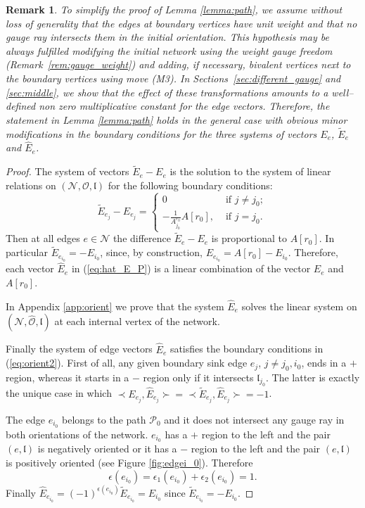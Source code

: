 \documentclass[11pt]{amsart}
\theoremstyle{plain}
\numberwithin{equation}{section}
\newtheorem{remark}{Remark}[subsection]
\begin{document}
\begin{remark}
To simplify the proof of Lemma \ref{lemma:path}, we assume without loss of generality that the edges at boundary vertices have unit weight and that no gauge ray intersects them in the initial orientation. This hypothesis may be always fulfilled modifying the initial network using the weight gauge freedom (Remark~\ref{rem:gauge_weight}) and adding, if necessary, bivalent vertices next to the boundary vertices using move (M3). 
In Sections~\ref{sec:different_gauge} and \ref{sec:middle}, we show that the effect of these transformations amounts to a well--defined non zero multiplicative constant for the edge vectors. Therefore, the statement in Lemma \ref{lemma:path} holds in the general case with obvious minor modifications in the boundary conditions for the three systems of vectors $E_e$, $\tilde E_e$ and $\hat E_e$.
\end{remark}


\begin{proof}
The system of vectors  $\tilde E_e - E_e$ is the solution to the system of linear relations on 
$({\mathcal N},\mathcal O,\mathfrak l)$ for the following boundary conditions: 
\[
\tilde E_{e_{j}}-E_{e_{j}} = \left\{ \begin{array}{ll} 0 & \mbox{ if } j\not = j_0;\\
-\frac{1}{A^{r_0}_{j_0}} A[r_0], &\mbox{ if } j = j_0.
\end{array}
\right.
\]
Then at all edges $e\in {\mathcal N}$ the difference $\tilde E_{e}-E_{e}$ is proportional to $A[r_0]$. In particular $\tilde E_{e_{i_0}} = -E_{i_0}$, since, by construction, $E_{e_{i_0}} = A[r_0] - E_{i_0}$. Therefore, each vector $\hat E_e$ in (\ref{eq:hat_E_P}) is a linear combination of the vector $E_e$ and $A[r_0]$.

In Appendix \ref{app:orient} we prove that the system $\hat E_e$ solves the linear system on $({\mathcal N},{\hat {\mathcal O}},\mathfrak l)$ at each internal vertex of the network. 

Finally the system of edge vectors ${\hat E}_e$ satisfies the boundary conditions in (\ref{eq:orient2}). First of all, any given boundary sink edge $e_j$, $j\not = j_0, i_0$, ends in a $+$ region, whereas it starts in a $-$ region only if it intersects $\mathfrak{l}_{j_0}$. The latter is exactly the unique case in which $\prec E_{e_j}, \hat E_{e_j} \succ =\prec \tilde E_{e_j}, \hat E_{e_j} \succ =-1$. 

The edge $e_{i_0}$ belongs to the path $\mathcal P_0$ and it does not intersect any gauge ray in both orientations of the network. $e_{i_0}$ has a $+$ region to the left and the pair $(e,\mathfrak{l})$ is negatively oriented or it has a $-$ region to the left and the pair $(e,\mathfrak{l})$ is positively oriented (see Figure \ref{fig:edgei_0}). Therefore
\[
\epsilon (e_{i_0}) = \epsilon_1 (e_{i_0}) + \epsilon_2 (e_{i_0}) =1.
\]
Finally $\hat E_{e_{i_0}} = (-1)^{\epsilon (e_{i_0})} \tilde E_{e_{i_0}} = E_{i_0}$ since $\tilde E_{e_{i_0}} = - E_{i_0}$. 
\end{proof}
\end{document}
